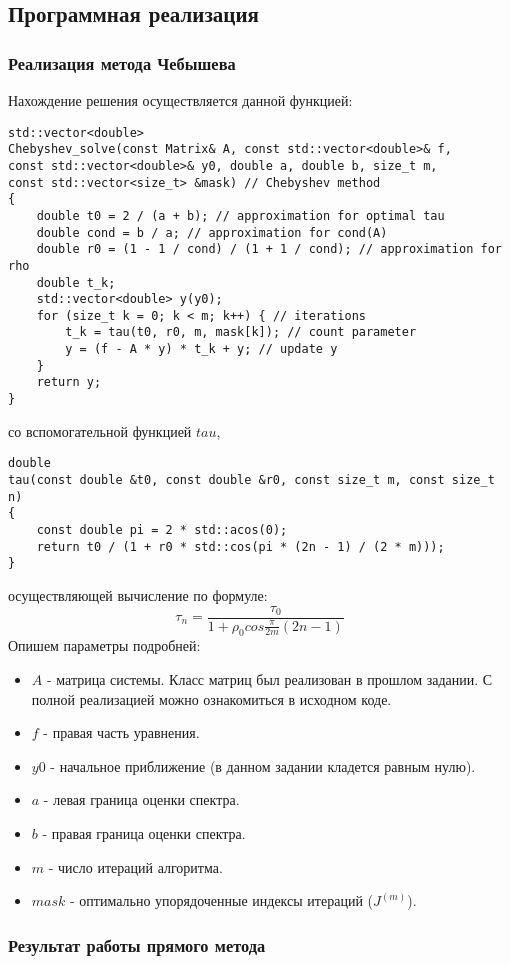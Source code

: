 \documentclass[a4paper,12pt,titlepage,final]{article}
\begin{document}
\subsection{Программная реализация}
\subsubsection{Реализация метода Чебышева}
Нахождение решения осуществляется данной функцией: 
\begin{verbatim}
std::vector<double>
Chebyshev_solve(const Matrix& A, const std::vector<double>& f,
const std::vector<double>& y0, double a, double b, size_t m, 
const std::vector<size_t> &mask) // Chebyshev method
{
    double t0 = 2 / (a + b); // approximation for optimal tau
    double cond = b / a; // approximation for cond(A)
    double r0 = (1 - 1 / cond) / (1 + 1 / cond); // approximation for rho
    double t_k;
    std::vector<double> y(y0);
    for (size_t k = 0; k < m; k++) { // iterations
        t_k = tau(t0, r0, m, mask[k]); // count parameter
        y = (f - A * y) * t_k + y; // update y
    }
    return y;
}
\end{verbatim}
со вспомогательной функцией $tau$,
\begin{verbatim}
double
tau(const double &t0, const double &r0, const size_t m, const size_t n)
{
    const double pi = 2 * std::acos(0);
    return t0 / (1 + r0 * std::cos(pi * (2n - 1) / (2 * m)));
}
\end{verbatim}
осуществляющей вычисление по формуле:
$$\tau_n = \frac{\tau_0}{1 + \rho_0cos\frac{\pi}{2m}(2n-1)}$$
Опишем параметры подробней:
\begin{itemize}
    \item $A$ - матрица системы. Класс матриц был реализован в прошлом задании. С полной реализацией можно ознакомиться в исходном коде.
    \item $f$ - правая часть уравнения.
    \item $y0$ - начальное приближение (в данном задании кладется равным нулю).
    \item $a$ - левая граница оценки спектра.
    \item $b$ - правая граница оценки спектра.
    \item $m$ - число итераций алгоритма.
    \item $mask$ - оптимально упорядоченные индексы итераций ($J^{(m)}$).
\end{itemize}
\subsubsection{Результат работы прямого метода}
\end{document}

